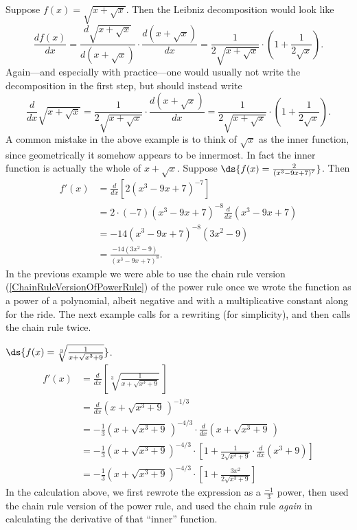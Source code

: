 \bex Suppose $f(x)=\sqrt{x+\sqrt{x}}$.  Then the Leibniz decomposition
would look like
$$
\frac{d f(x)}{dx}
=\frac{d\sqrt{x+\sqrt{x}}}{d\left(x+\sqrt{x}\right)}
    \cdot\frac{d\left(x+\sqrt{x}\right)}{dx}
=\frac1{2\sqrt{x+\sqrt{x}}}\cdot\left(1+\frac1{2\sqrt{x}}\right).$$
Again---and especially with practice---one would usually not
write the decomposition in the first step, but should
instead write
$$\frac{d}{dx}\sqrt{x+\sqrt{x}}=\frac1{2\sqrt{x+\sqrt{x}}}
  \cdot\frac{d\left(x+\sqrt{x}\right)}{dx}
   =\frac1{2\sqrt{x+\sqrt{x}}}\cdot\left(1+\frac1{2\sqrt{x}}\right).$$
\eex
A common mistake in the above example is to think of $\sqrt{x}$
as the inner function, since geometrically it somehow appears
to be innermost.  In fact the inner function is actually the whole
of $x+\sqrt{x}$.
\bex Suppose $\ds{f(x)=\frac2{(x^3-9x+7)^7}}$.  Then
\begin{align*}
f'(x)&=\frac{d}{dx}\left[2(x^3-9x+7)^{-7}\right]\\
     &=2\cdot(-7)(x^3-9x+7)^{-8}\frac{d}{dx}(x^3-9x+7)\\
     &=-14(x^3-9x+7)^{-8}(3x^2-9)\\
     &=\frac{-14(3x^2-9)}{(x^3-9x+7)^8}.\end{align*}
\eex
In the previous example we were able to use the 
chain rule version (\ref{ChainRuleVersionOfPowerRule})
of the power rule once we wrote the function as
a power of a polynomial, albeit negative and with a multiplicative constant
along for the ride.  The next example calls for a rewriting (for simplicity),
and then calls the chain rule twice.

\bex $\ds{f(x)=\sqrt[3]{\frac1{x+\sqrt{x^3+9}}}}$.
\begin{align*}
f'(x)&=\frac{d}{dx}\left[\sqrt[3]{\frac1{x+\sqrt{x^3+9}}}\,\right]\\
&=\frac{d}{dx}\left(x+\sqrt{x^3+9}\,\right)^{-1/3}\\
&=-\frac13\left(x+\sqrt{x^3+9}\,\right)^{-4/3}
   \cdot\frac{d}{dx}\left(x+\sqrt{x^3+9}\,\right)\\
&=-\frac13\left(x+\sqrt{x^3+9}\right)^{-4/3}
 \cdot\left[1+\frac1{2\sqrt{x^3+9}}\cdot\frac{d}{dx}(x^3+9)\right]\\
&=-\frac13\left(x+\sqrt{x^3+9}\right)^{-4/3}
 \cdot\left[1+\frac{3x^2}{2\sqrt{x^3+9}}\right]
\end{align*}\eex
In the calculation above, we first rewrote the expression as a
$\frac{-1}3$ power, then used the chain rule version of the
power rule, and used the chain rule {\it again} in calculating
the derivative of that ``inner'' function.




